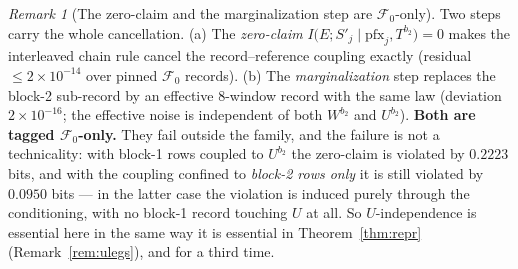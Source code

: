 \documentclass[11pt]{article}
\theoremstyle{definition}
\theoremstyle{remark}
\newtheorem{remark}{Remark}
\begin{document}
\begin{remark}[The zero-claim and the marginalization step are
$\mathcal F_0$-only]
\label{rem:f0only}
Two steps carry the whole cancellation. (a) The \emph{zero-claim}
$I\bigl(E;S'_j\mid \mathrm{pfx}_j,T^{b_2}\bigr)=0$ makes the interleaved
chain rule cancel the record--reference coupling exactly (residual
$\le2\times10^{-14}$ over pinned $\mathcal F_0$ records). (b) The
\emph{marginalization} step replaces the block-2 sub-record by an
effective $8$-window record with the same law (deviation
$2\times10^{-16}$; the effective noise is independent of both
$W^{b_2}$ and $U^{b_2}$).
\textbf{Both are tagged $\mathcal F_0$-only.} They fail outside the
family, and the failure is not a technicality: with block-1 rows
coupled to $U^{b_2}$ the zero-claim is violated by $0.2223$ bits, and
with the coupling confined to \emph{block-2 rows only} it is still
violated by $0.0950$ bits --- in the latter case the violation is
induced purely through the conditioning, with no block-1 record
touching $U$ at all. So $U$-independence is essential here in the
same way it is essential in Theorem~\ref{thm:repr}
(Remark~\ref{rem:ulegs}), and for a third time.
\end{remark}
\end{document}
